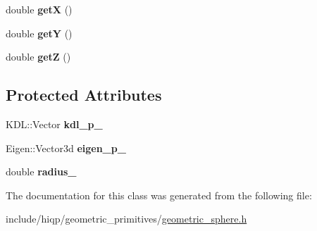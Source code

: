 \begin{DoxyCompactItemize}
\item 
\hypertarget{classhiqp_1_1GeometricSphere_add5be78f8fa733bc9968cc6c7f936034}{double {\bfseries get\-X} ()}\label{classhiqp_1_1GeometricSphere_add5be78f8fa733bc9968cc6c7f936034}

\item 
\hypertarget{classhiqp_1_1GeometricSphere_aeda128e21613c073d12e44a56582bcfc}{double {\bfseries get\-Y} ()}\label{classhiqp_1_1GeometricSphere_aeda128e21613c073d12e44a56582bcfc}

\item 
\hypertarget{classhiqp_1_1GeometricSphere_ab7760ace43155e0987674ebcded4a775}{double {\bfseries get\-Z} ()}\label{classhiqp_1_1GeometricSphere_ab7760ace43155e0987674ebcded4a775}

\end{DoxyCompactItemize}
\subsection*{Protected Attributes}
\begin{DoxyCompactItemize}
\item 
\hypertarget{classhiqp_1_1GeometricSphere_a3a11c82f4f780804b355a31fe1567c1a}{K\-D\-L\-::\-Vector {\bfseries kdl\-\_\-p\-\_\-}}\label{classhiqp_1_1GeometricSphere_a3a11c82f4f780804b355a31fe1567c1a}

\item 
\hypertarget{classhiqp_1_1GeometricSphere_a908f26205e56f9f0290c96afc7d338bd}{Eigen\-::\-Vector3d {\bfseries eigen\-\_\-p\-\_\-}}\label{classhiqp_1_1GeometricSphere_a908f26205e56f9f0290c96afc7d338bd}

\item 
\hypertarget{classhiqp_1_1GeometricSphere_ad20341fdc0885b1e860d6a0f8501d49b}{double {\bfseries radius\-\_\-}}\label{classhiqp_1_1GeometricSphere_ad20341fdc0885b1e860d6a0f8501d49b}

\end{DoxyCompactItemize}


The documentation for this class was generated from the following file\-:\begin{DoxyCompactItemize}
\item 
include/hiqp/geometric\-\_\-primitives/\hyperlink{geometric__sphere_8h}{geometric\-\_\-sphere.\-h}\end{DoxyCompactItemize}
